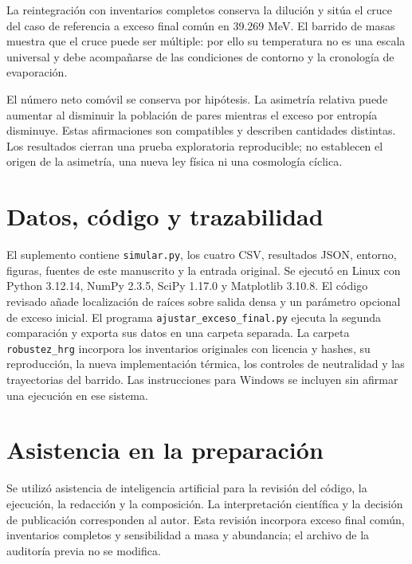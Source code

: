 \documentclass[10pt,twocolumn,a4paper]{article}
\begin{document}
La reintegración con inventarios completos conserva la dilución y sitúa el cruce del caso de referencia a exceso final común en 39.269 MeV. El barrido de masas muestra que el cruce puede ser múltiple: por ello su temperatura no es una escala universal y debe acompañarse de las condiciones de contorno y la cronología de evaporación.

El número neto comóvil se conserva por hipótesis. La asimetría relativa puede aumentar al disminuir la población de pares mientras el exceso por entropía disminuye. Estas afirmaciones son compatibles y describen cantidades distintas. Los resultados cierran una prueba exploratoria reproducible; no establecen el origen de la asimetría, una nueva ley física ni una cosmología cíclica.

\section*{Datos, código y trazabilidad}
El suplemento contiene \texttt{simular.py}, los cuatro CSV, resultados JSON, entorno, figuras, fuentes de este manuscrito y la entrada original. Se ejecutó en Linux con Python 3.12.14, NumPy 2.3.5, SciPy 1.17.0 y Matplotlib 3.10.8. El código revisado añade localización de raíces sobre salida densa y un parámetro opcional de exceso inicial. El programa \texttt{ajustar\_exceso\_final.py} ejecuta la segunda comparación y exporta sus datos en una carpeta separada. La carpeta \texttt{robustez\_hrg} incorpora los inventarios originales con licencia y hashes, su reproducción, la nueva implementación térmica, los controles de neutralidad y las trayectorias del barrido. Las instrucciones para Windows se incluyen sin afirmar una ejecución en ese sistema.

\section*{Asistencia en la preparación}
Se utilizó asistencia de inteligencia artificial para la revisión del código, la ejecución, la redacción y la composición. La interpretación científica y la decisión de publicación corresponden al autor. Esta revisión incorpora exceso final común, inventarios completos y sensibilidad a masa y abundancia; el archivo de la auditoría previa no se modifica.
\end{document}

